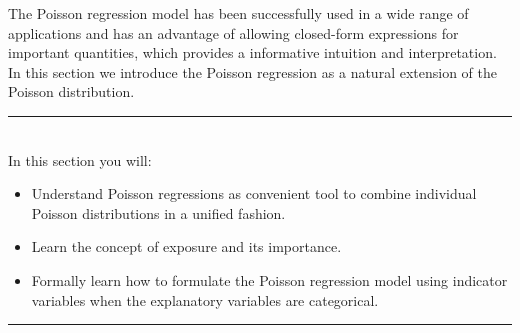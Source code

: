 \documentclass[12pt]{article}
\def\E{\mathrm{E}}
\begin{document}
%
The Poisson regression model has been successfully used in a wide range of applications and has an advantage of allowing closed-form expressions for important quantities, which provides a informative intuition and interpretation. In this section we introduce the Poisson regression as a natural extension of the Poisson distribution.

\noindent\rule{12cm}{0.4pt}\\
In this section you will:
\begin{itemize}
  \item Understand Poisson regressions as convenient tool to combine individual Poisson distributions in a unified fashion.
 \item Learn the concept of exposure and its importance.
 \item Formally learn how to formulate the Poisson regression model using indicator variables when the explanatory variables are categorical.
\end{itemize}\rule{12cm}{0.4pt}
\end{document}
